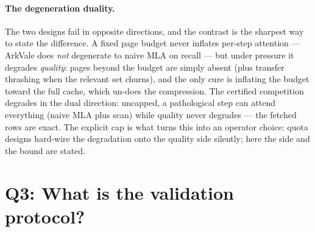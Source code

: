 \documentclass[11pt]{article}
\begin{document}
\paragraph{The degeneration duality.} The two designs fail in opposite
directions, and the contrast is the sharpest way to state the difference. A
fixed page budget never inflates per-step attention --- ArkVale does
\emph{not} degenerate to naive MLA on recall --- but under pressure it
degrades \emph{quality}: pages beyond the budget are simply absent (plus
transfer thrashing when the relevant set churns), and the only cure is
inflating the budget toward the full cache, which un-does the compression.
The certified competition degrades in the dual direction: uncapped, a
pathological step can attend everything (naive MLA plus scan) while quality
never degrades --- the fetched rows are exact. The explicit cap is what
turns this into an operator choice: quota designs hard-wire the degradation
onto the quality side silently; here the side and the bound are stated.

\section{Q3: What is the validation protocol?}
\end{document}
